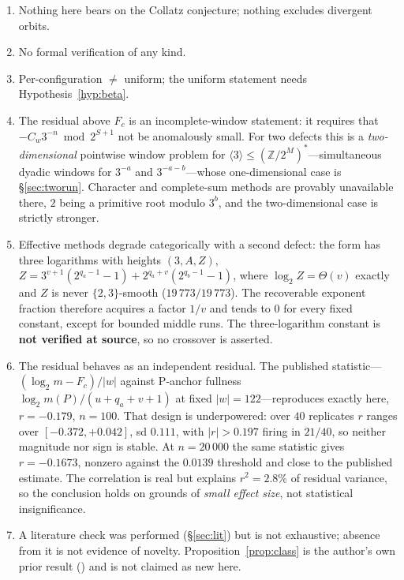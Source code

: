 \documentclass[11pt,a4paper]{article}
\theoremstyle{plain}
\theoremstyle{definition}
\newcommand{\Fc}{F_{c}}
\begin{document}
\begin{enumerate}[nosep,leftmargin=*]
\item Nothing here bears on the Collatz conjecture; nothing excludes divergent
orbits.
\item No formal verification of any kind.
\item Per-configuration $\ne$ uniform; the uniform statement needs
Hypothesis~\ref{hyp:beta}.
\item The residual above $\Fc$ is an incomplete-window statement: it requires
that $-C_w3^{-n}\bmod 2^{S+1}$ not be anomalously small. For two defects this
is a \emph{two-dimensional} pointwise window problem for
$\langle3\rangle\le(\mathbb{Z}/2^{M})^{*}$---simultaneous dyadic windows for
$3^{-a}$ and $3^{-a-b}$---whose one-dimensional case is \S\ref{sec:tworun}.
Character and complete-sum methods are provably unavailable there, $2$ being a
primitive root modulo $3^{b}$, and the two-dimensional case is strictly
stronger.
\item Effective methods degrade categorically with a second defect: the form
has three logarithms with heights $(3,A,Z)$,
$Z=3^{v+1}(2^{q_a-1}-1)+2^{q_a+v}(2^{q_b-1}-1)$, where $\log_2Z=\Theta(v)$
exactly and $Z$ is never $\{2,3\}$-smooth ($19\,773/19\,773$). The recoverable
exponent fraction therefore acquires a factor $1/v$ and tends to $0$ for every
fixed constant, except for bounded middle runs. The three-logarithm constant is
\textbf{not verified at source}, so no crossover is asserted.
\item The residual behaves as an independent residual. The published
statistic---$(\log_2m-\Fc)/|w|$ against P-anchor fullness
$\log_2m(P)/(u+q_a+v+1)$ at fixed $|w|=122$---reproduces exactly here,
$r=-0.179$, $n=100$. That design is underpowered: over $40$ replicates $r$
ranges over $[-0.372,+0.042]$, sd $0.111$, with $|r|>0.197$ firing in $21/40$,
so neither magnitude nor sign is stable. At $n=20\,000$ the same statistic
gives $r=-0.1673$, nonzero against the $0.0139$ threshold and close to the
published estimate. The correlation is real but explains $r^{2}=2.8\%$ of
residual variance, so the conclusion holds on grounds of \emph{small effect
size}, not statistical insignificance.
\item A literature check was performed (\S\ref{sec:lit}) but is not
exhaustive; absence from it is not evidence of novelty.
Proposition~\ref{prop:class} is the author's own prior result
(\cite{dejesus-erratum}) and is not claimed as new here.
\end{enumerate}
\end{document}
